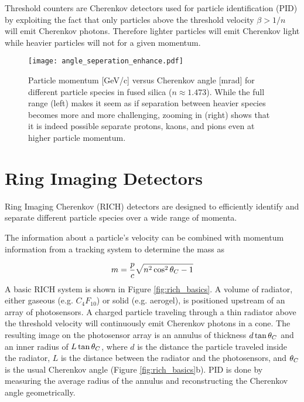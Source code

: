 Threshold counters are Cherenkov detectors used for particle identification (PID) by exploiting the fact that only particles above the threshold velocity $\beta > 1/n$ will emit Cherenkov photons. Therefore lighter particles will emit Cherenkov light while heavier particles will not for a given momentum.

\begin{figure}[!htb]
	\centering
	\texttt{[image: angle\_seperation\_enhance.pdf]}
	\caption{Particle momentum [GeV/c] versus Cherenkov angle [mrad] for different particle species in fused silica ($n \approx 1.473$). While the full range (left) makes it seem as if separation between heavier species becomes more and more challenging, zooming in (right) shows that it is indeed possible separate protons, kaons, and pions even at higher particle momentum.}
	\label{fig:angleseperation}
\end{figure}

\section{Ring Imaging Detectors}
Ring Imaging Cherenkov (RICH) detectors are designed to efficiently identify and separate different particle species over a wide range of momenta.

The information about a particle's velocity can be combined with momentum information from a tracking system to determine the mass as \cite{ParticleDetectionHandbook}

\begin{equation}
	m = \frac{p}{c} \sqrt{n^2 \cos^2\theta_{C} - 1}
	\label{eq:mass}
\end{equation}
%
A basic RICH system is shown in Figure \ref{fig:rich_basics}. A volume of radiator, either gaseous (e.g. $C_{4}F_{10}$) or solid (e.g. aerogel), is positioned upstream of an array of photosensors. A charged particle traveling through a thin radiator above the threshold velocity will continuously emit Cherenkov photons in a cone. The resulting image on the photosensor array is an annulus of thickness $d\tan\theta_{C}$ and an inner radius of $L\tan\theta_{C}$, where $d$ is the distance the particle traveled inside the radiator, $L$ is the distance between the radiator and the photosensors, and  $\theta_{C}$ is the usual Cherenkov angle (Figure \ref{fig:rich_basics}b). PID is done by measuring the average radius of the annulus and reconstructing the Cherenkov angle geometrically.

